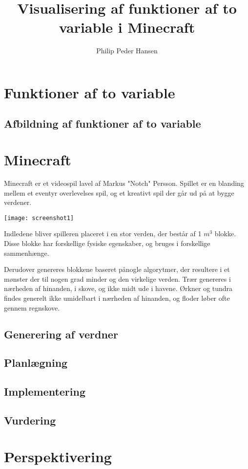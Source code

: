 \documentclass[a4paper,12pt]{report}
\author{Philip Peder Hansen}
\title{Visualisering af funktioner af to variable i Minecraft}
\begin{document}
	\maketitle
	\tableofcontents
	\clearpage
	\section{Funktioner af to variable}
	\subsection{Afbildning af funktioner af to variable}
	\section{Minecraft}
		Minecraft er et videospil lavel af Markus "Notch" Persson.
		Spillet er en blanding mellem et eventyr overlevelses spil, og et kreativt spil der går ud på at bygge verdener.

		\vspace{5 mm}
		\texttt{[image: screenshot1]}
		\vspace{5 mm}

		Indledene bliver spilleren placeret i en stor verden, der består af 1 $m^3$ blokke. Disse blokke har forskellige fysiske egenskaber,
		og bruges i forskellige sammenhænge.

		Derudover genereres blokkene baseret p\aa  nogle algorytmer, der resultere i et m\o nster der til nogen grad minder
		og den virkelige verden. Tr\ae r genereres i n\ae rheden af hinanden, i skove, og ikke midt ude i havene.
		\O rkner og tundra findes generelt ikke umidelbart i n\ae rheden af hinanden, og floder l\o ber ofte gennem regnskove. 
	\subsection{Generering af verdner}
	\subsection{Planlægning}
	\subsection{Implementering}
	\subsection{Vurdering}
	\section{Perspektivering}
\end{document}
